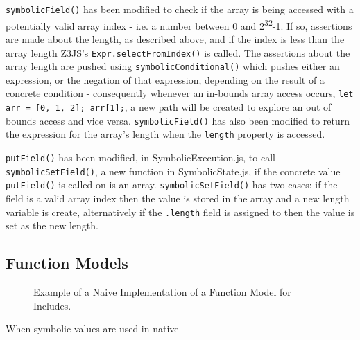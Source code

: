 \documentclass[]{final_report}
\begin{document}
\lstinline|symbolicField()| has been modified to check if the array is being accessed with a potentially valid array index - i.e. a number between 0 and 2\textsuperscript{32}-1. If so, assertions are made about the length, as described above, and if the index is less than the array length Z3JS’s \lstinline|Expr.selectFromIndex()| is called. The assertions about the array length are pushed using \lstinline|symbolicConditional()| which pushes either an expression, or the negation of that expression, depending on the result of a concrete condition - consequently whenever an in-bounds array access occurs, \lstinline|let arr = [0, 1, 2]; arr[1];|, a new path will be created to explore an out of bounds access and vice versa. \lstinline|symbolicField()| has also been modified to return the expression for the array's length when the \lstinline|length| property is accessed.

\lstinline|putField()| has been modified, in SymbolicExecution.js, to call \lstinline|symbolicSetField()|, a new function in SymbolicState.js, if the concrete value \lstinline|putField()| is called on is an array. \lstinline|symbolicSetField()| has two cases: if the field is a valid array index then the value is stored in the array and a new length variable is create, alternatively if the \lstinline|.length| field is assigned to then the value is set as the new length.

\subsection{Function Models}
\begin{figure}[t]

\caption{\label{fig:naive-includes} Example of a Naive Implementation of a Function Model for Includes.}
\end{figure}

When symbolic values are used in native %
\end{document}
